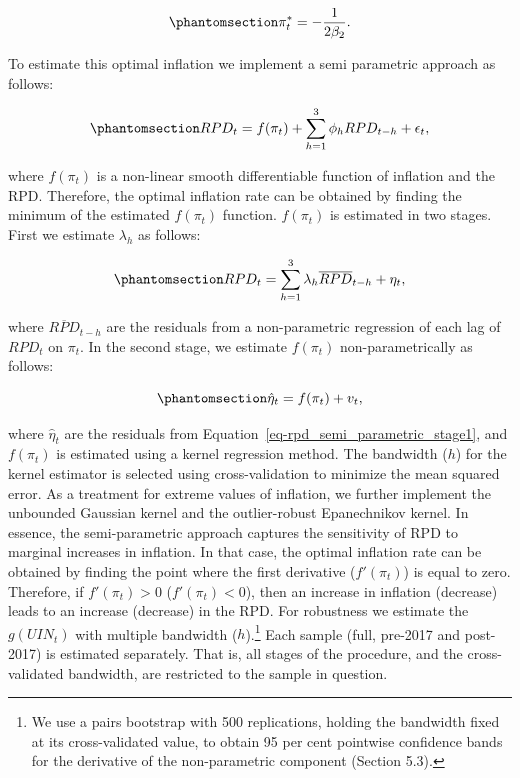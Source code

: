 \documentclass[
  letterpaper,
  DIV=11,
  numbers=noendperiod]{scrartcl}
\begin{document}
\begin{equation}\phantomsection\label{eq-optimal_inflation}{\pi_t^* = -\dfrac{1}{2\beta_2}.}\end{equation}

To estimate this optimal inflation we implement a semi parametric
approach as follows:

\begin{equation}\phantomsection\label{eq-rpd_semi_parametric_f}{RPD_t =  f(\pi_t) + \sum_{h=1}^{3}\phi_hRPD_{t-h} + \epsilon_t, }\end{equation}

where \(f(\pi_t)\) is a non-linear smooth differentiable function of
inflation and the RPD. Therefore, the optimal inflation rate can be
obtained by finding the minimum of the estimated \(f(\pi_t)\) function.
\(f(\pi_t)\) is estimated in two stages. First we estimate \(\lambda_h\)
as follows:

\begin{equation}\phantomsection\label{eq-rpd_semi_parametric_stage1}{ RPD_t = \sum_{h=1}^{3}\lambda_h\overline{RPD}_{t-h} + \eta_t, }\end{equation}

where \(\overline{RPD}_{t-h}\) are the residuals from a non-parametric
regression of each lag of \(RPD_t\) on \(\pi_t\). In the second stage,
we estimate \(f(\pi_t)\) non-parametrically as follows:

\begin{equation}\phantomsection\label{eq-rpd_semi_parametric_stage2}{\hat{\eta}_t = f(\pi_t) + v_t, }\end{equation}

where \(\hat{\eta}_t\) are the residuals from
Equation~\ref{eq-rpd_semi_parametric_stage1}, and \(f(\pi_t)\) is
estimated using a kernel regression method. The bandwidth (\(h\)) for
the kernel estimator is selected using cross-validation to minimize the
mean squared error. As a treatment for extreme values of inflation, we
further implement the unbounded Gaussian kernel and the outlier-robust
Epanechnikov kernel. In essence, the semi-parametric approach captures
the sensitivity of RPD to marginal increases in inflation. In that case,
the optimal inflation rate can be obtained by finding the point where
the first derivative (\(f'(\pi_t)\)) is equal to zero. Therefore, if
\(f'(\pi_t) > 0\) (\(f'(\pi_t) < 0\)), then an increase in inflation
(decrease) leads to an increase (decrease) in the RPD. For robustness we
estimate the \(g(UIN_t)\) with multiple bandwidth (\(h\)).\footnote{We
  use a pairs bootstrap with 500 replications, holding the bandwidth
  fixed at its cross-validated value, to obtain 95 per cent pointwise
  confidence bands for the derivative of the non-parametric component
  (Section 5.3).} Each sample (full, pre-2017 and post-2017) is
estimated separately. That is, all stages of the \citet{robinson1988a}
procedure, and the cross-validated bandwidth, are restricted to the
sample in question.
\end{document}
